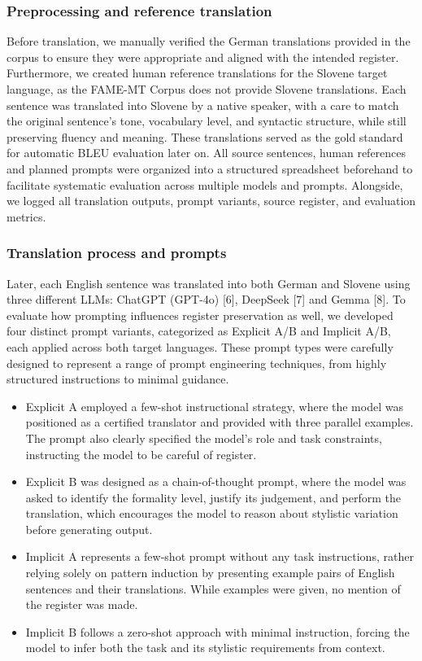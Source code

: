 \documentclass[fleqn,moreauthors,10pt]{ds_report}
\begin{document}
	\subsubsection*{Preprocessing and reference translation}
	
Before translation, we manually verified the German translations provided in the corpus to ensure they were appropriate and aligned with the intended register. Furthermore, we created human reference translations for the Slovene target language, as the FAME-MT Corpus does not provide Slovene translations. Each sentence was translated into Slovene by a native speaker, with a care to match the original sentence’s tone, vocabulary level, and syntactic structure, while still preserving fluency and meaning. These translations served as the gold standard for automatic BLEU evaluation later on.
All source sentences, human references and planned prompts were organized into a structured spreadsheet beforehand to facilitate systematic evaluation across multiple models and prompts. Alongside, we logged all translation outputs, prompt variants, source register, and evaluation metrics.

\subsubsection*{Translation process and prompts}

Later, each English sentence was translated into both German and Slovene using three different LLMs: ChatGPT (GPT-4o) [6], DeepSeek [7] and Gemma [8]. To evaluate how prompting influences register preservation as well, we developed four distinct prompt variants, categorized as Explicit A/B and Implicit A/B, each applied across both target languages. These prompt types were carefully designed to represent a range of prompt engineering techniques, from highly structured instructions to minimal guidance. 
		
\begin{itemize}
	\item Explicit A employed a few-shot instructional strategy, where the model was positioned as a certified translator and provided with three parallel examples. The prompt also clearly specified the model’s role and task constraints, instructing the model to be careful of register.
	\item Explicit B was designed as a chain-of-thought prompt, where the model was asked to identify the formality level, justify its judgement, and perform the translation, which encourages the model to reason about stylistic variation before generating output.
	\item Implicit A represents a few-shot prompt without any task instructions, rather relying solely on pattern induction by presenting example pairs of English sentences and their translations. While examples were given, no mention of the register was made.
	\item Implicit B follows a zero-shot approach with minimal instruction, forcing the model to infer both the task and its stylistic requirements from context.
\end{itemize}
	
\end{document}
